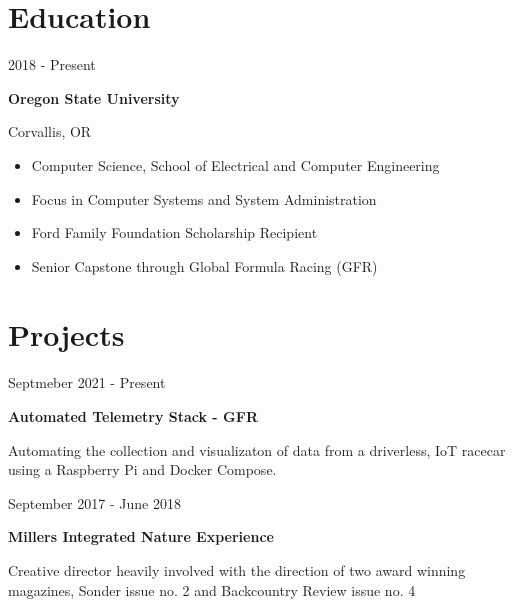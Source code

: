 \documentclass[12pt,letterpaper]{article}
\begin{document}
	
	\noindent
	\begin{minipage}[t]{0.45\linewidth}

		\vspace{0.5cm}

	\section*{Education}
	2018 - Present
	
	\textbf{Oregon State University}

	Corvallis, OR
    
    \begin{itemize}
        \item Computer Science, School of Electrical and Computer Engineering
        \item Focus in Computer Systems and System Administration
        \item Ford Family Foundation Scholarship Recipient
      	\item Senior Capstone through Global Formula Racing (GFR) 
        
    \end{itemize}
    
    \section*{Projects}
    
    Septmeber 2021 - Present

    \textbf{Automated Telemetry Stack - GFR}

    Automating the collection and visualizaton of data from a driverless, IoT racecar using a Raspberry Pi and Docker Compose. 
    
    \vspace{0.5cm}
    
    September 2017 - June 2018
    
    \textbf{Millers Integrated Nature Experience}
    
    Creative director heavily involved with the direction of two award winning magazines, Sonder issue no. 2 and Backcountry Review issue no. 4
	
\end{minipage}
\hspace{1cm}
\end{document}

